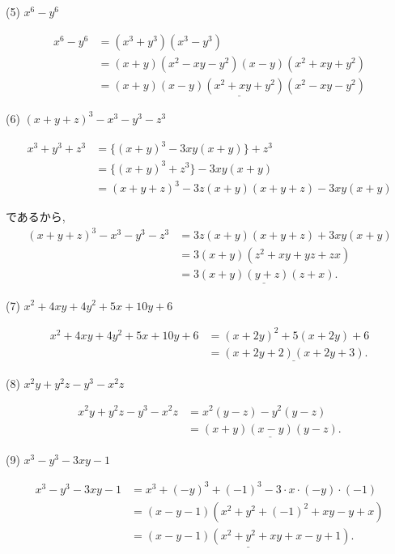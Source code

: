 \documentclass[dvipdfmx]{jsarticle}
\begin{document}
\bigskip

(5) $x^6 - y^6$

$$
\begin{aligned}
  x^6 - y^6
  &= (x^3 + y^3)(x^3 - y^3) \\
  &= (x+y)(x^2 -xy - y^2)(x-y)(x^2 + xy + y^2) \\
  &= \underline{(x+y)(x-y)(x^2 + xy + y^2)(x^2 -xy - y^2)}
\end{aligned}
$$

\bigskip

(6) $(x + y + z)^3 -x^3 - y^3 - z^3$

$$
\begin{aligned}
  x^3 + y^3 + z^3
  &= \{(x+y)^3 -3xy(x+y)\} + z^3 \\
  &= \{(x+y)^3 + z^3\} -3xy(x+y) \\
  &= (x+y+z)^3 - 3z(x+y)(x+y+z) - 3xy(x+y)
\end{aligned}
$$

であるから, \ 
$$
\begin{aligned}
  (x + y + z)^3 -x^3 - y^3 - z^3
  &= 3z(x+y)(x+y+z) + 3xy(x+y) \\
  &= 3(x+y)(z^2 + xy + yz + zx) \\
  &= \underline{3(x+y)(y+z)(z+x)}.
\end{aligned}
$$

(7) $x^2 + 4xy + 4y^2 + 5x + 10y + 6$

$$
\begin{aligned}
  x^2 + 4xy + 4y^2 + 5x + 10y + 6
  &= (x+2y)^2 + 5(x+2y) + 6 \\
  &= \underline{(x+2y+2)(x+2y+3)}.
\end{aligned}
$$

\bigskip

(8) $x^2y + y^2z - y^3 - x^2z$

$$
\begin{aligned}
  x^2y + y^2z - y^3 - x^2z
  &= x^2(y-z) - y^2(y-z) \\
  &= \underline{(x+y)(x-y)(y-z)}.
\end{aligned}
$$

\bigskip

(9) $x^3 - y^3 -3xy -1$

$$
\begin{aligned}
  x^3 - y^3 -3xy -1
  &= x^3 + (-y)^3 + (-1)^3 -3\cdot x \cdot (-y) \cdot (-1)\\
  &= (x -y - 1)(x^2 + y^2 + (-1)^2 +xy - y + x) \\
  &= \underline{(x- y - 1)(x^2 + y^2 + xy + x - y + 1)}.
\end{aligned}
$$
\end{document}
